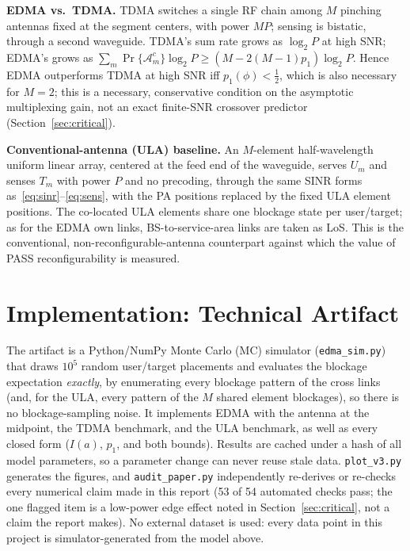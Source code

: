\documentclass[11pt,a4paper]{article}
\begin{document}
\textbf{EDMA vs.\ TDMA.} TDMA switches a single RF chain among $M$ pinching antennas fixed at the segment centers, with power $MP$; sensing is bistatic, through a second waveguide. TDMA's sum rate grows as $\log_2P$ at high SNR; EDMA's grows as $\sum_m\Pr\{\mathcal A_m^c\}\log_2P\ge(M-2(M-1)p_1)\log_2P$. Hence EDMA outperforms TDMA at high SNR iff $p_1(\phi)<\tfrac12$, which is also necessary for $M=2$; this is a necessary, conservative condition on the asymptotic multiplexing gain, not an exact finite-SNR crossover predictor (Section~\ref{sec:critical}).

\textbf{Conventional-antenna (ULA) baseline.} An $M$-element half-wavelength uniform linear array, centered at the feed end of the waveguide, serves $U_m$ and senses $T_m$ with power $P$ and no precoding, through the same SINR forms as~\eqref{eq:sinr}--\eqref{eq:sens}, with the PA positions replaced by the fixed ULA element positions. The co-located ULA elements share one blockage state per user/target; as for the EDMA own links, BS-to-service-area links are taken as LoS. This is the conventional, non-reconfigurable-antenna counterpart against which the value of PASS reconfigurability is measured.

\section{Implementation: Technical Artifact}
The artifact is a Python/NumPy Monte Carlo (MC) simulator (\texttt{edma\_sim.py}) that draws $10^5$ random user/target placements and evaluates the blockage expectation \emph{exactly}, by enumerating every blockage pattern of the cross links (and, for the ULA, every pattern of the $M$ shared element blockages), so there is no blockage-sampling noise. It implements EDMA with the antenna at the midpoint, the TDMA benchmark, and the ULA benchmark, as well as every closed form ($I(a)$, $p_1$, and both bounds). Results are cached under a hash of all model parameters, so a parameter change can never reuse stale data. \texttt{plot\_v3.py} generates the figures, and \texttt{audit\_paper.py} independently re-derives or re-checks every numerical claim made in this report (53 of 54 automated checks pass; the one flagged item is a low-power edge effect noted in Section~\ref{sec:critical}, not a claim the report makes). No external dataset is used: every data point in this project is simulator-generated from the model above.
\end{document}
